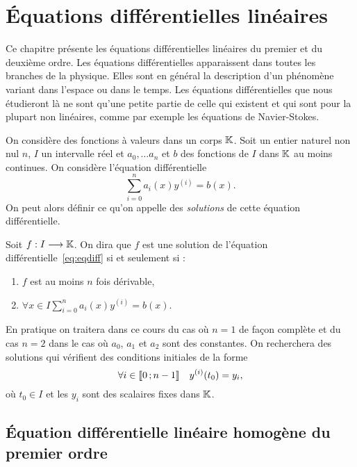 \chapter{Équations différentielles linéaires}
\label{chap:equadiff}
\minitoc
\minilof
\minilot

Ce chapitre présente les équations différentielles linéaires du premier et du deuxième ordre. Les équations différentielles apparaissent dans toutes les branches de la physique. Elles sont en général la description d'un phénomène variant dans l'espace ou dans le temps. Les équations différentielles que nous étudieront là ne sont qu'une petite partie de celle qui existent et qui sont pour la plupart non linéaires, comme par exemple les équations de Navier-Stokes.

On considère des fonctions à valeurs dans un corps $\mathbb{K}$. Soit un entier naturel non nul $n$, $I$ un intervalle réel et $a_0, \ldots a_n$ et $b$ des fonctions de $I$ dans $\mathbb{K}$ au moins continues. On considère l'équation différentielle
\begin{equation}
\sum_{i=0}^n a_i(x) y^{(i)} = b(x) \label{eq:eqdiff}.
\end{equation}
On peut alors définir ce qu'on appelle des \emph{solutions} de cette équation différentielle.
\begin{defdef}
Soit $f : I \longrightarrow \mathbb{K}$. On dira que $f$ est une solution de l'équation différentielle~\eqref{eq:eqdiff} si et seulement si :
\begin{enumerate}
\item $f$ est au moins $n$ fois dérivable,
\item $\forall x \in I \sum_{i=0}^n a_i(x) y^{(i)} = b(x)$.
\end{enumerate}
\end{defdef}
En pratique on traitera dans ce cours du cas où $n=1$ de façon complète et du cas $n=2$ dans le cas où $a_0$, $a_1$ et $a_2$ sont des constantes. On recherchera des solutions qui vérifient des conditions initiales de la forme 
\begin{equation}
 \forall i \in \mathopen{\llbracket}0\mathclose{}\mathpunct{};n-1\mathclose{\rrbracket} \quad y^{(i)}(t_0)=y_i,
\end{equation}
où $t_0 \in I$  et les $y_i$ sont des scalaires fixes dans $\mathbb{K}$.
\section{Équation différentielle linéaire homogène du premier ordre}
\label{sec:equadifflinhomog1}
